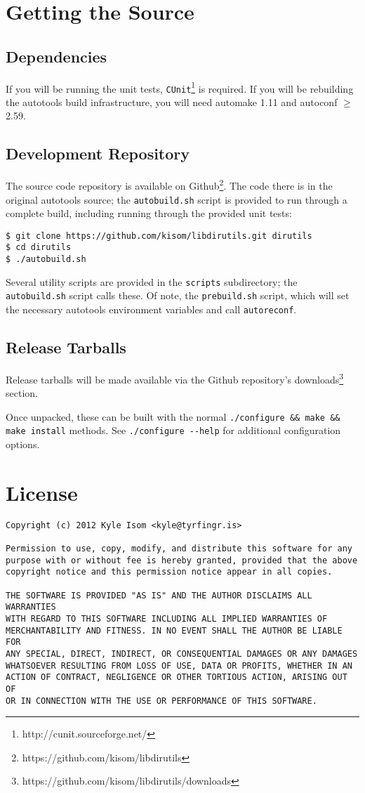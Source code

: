 \documentclass[10pt,letterpaper]{article}
\begin{document}
\section*{Getting the Source}
\subsection*{Dependencies}
If you will be running the unit tests, \verb|CUnit|\footnote{http://cunit.sourceforge.net/}
is required. If you will be rebuilding the autotools build infrastructure,
you will need automake 1.11 and autoconf $\geq$ 2.59.
\subsection*{Development Repository}
The source code repository is available on Github\footnote{https://github.com/kisom/libdirutils}.
The code there is in the original autotools source; the \verb|autobuild.sh|
script is provided to run through a complete build, including running through
the provided unit tests:

\begin{verbatim}
$ git clone https://github.com/kisom/libdirutils.git dirutils
$ cd dirutils
$ ./autobuild.sh
\end{verbatim}

Several utility scripts are provided in the \verb|scripts| subdirectory;
the \verb|autobuild.sh| script calls these. Of note, the \verb|prebuild.sh|
script, which will set the necessary autotools environment variables and call
\verb|autoreconf|.
\subsection*{Release Tarballs}
Release tarballs will be made available via the Github repository's
downloads\footnote{https://github.com/kisom/libdirutils/downloads} section.

Once unpacked, these can be built with the normal
\verb|./configure && make && make install| methods. See
\verb|./configure --help| for additional configuration options.

\section*{License}
\begin{verbatim}
Copyright (c) 2012 Kyle Isom <kyle@tyrfingr.is>

Permission to use, copy, modify, and distribute this software for any
purpose with or without fee is hereby granted, provided that the above 
copyright notice and this permission notice appear in all copies.

THE SOFTWARE IS PROVIDED "AS IS" AND THE AUTHOR DISCLAIMS ALL WARRANTIES
WITH REGARD TO THIS SOFTWARE INCLUDING ALL IMPLIED WARRANTIES OF
MERCHANTABILITY AND FITNESS. IN NO EVENT SHALL THE AUTHOR BE LIABLE FOR
ANY SPECIAL, DIRECT, INDIRECT, OR CONSEQUENTIAL DAMAGES OR ANY DAMAGES
WHATSOEVER RESULTING FROM LOSS OF USE, DATA OR PROFITS, WHETHER IN AN
ACTION OF CONTRACT, NEGLIGENCE OR OTHER TORTIOUS ACTION, ARISING OUT OF
OR IN CONNECTION WITH THE USE OR PERFORMANCE OF THIS SOFTWARE. 
\end{verbatim}
\end{document}
